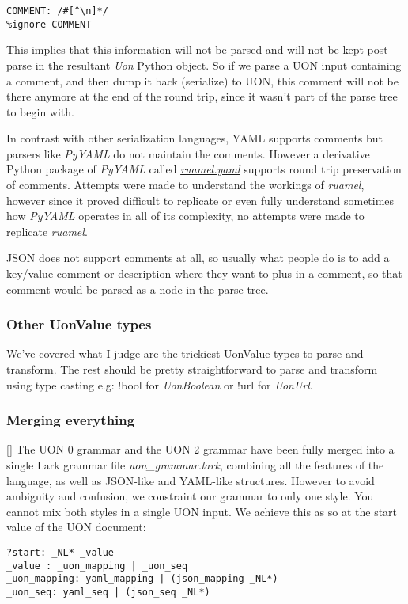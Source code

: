 \documentclass[12pt]{article}
\begin{document}
\begin{lstlisting}
COMMENT: /#[^\n]*/
%ignore COMMENT
\end{lstlisting}

This implies that this information will not be parsed and will not be kept post-parse in the resultant \emph{Uon} Python object. So if we parse a UON input containing a comment, and then dump it back (serialize) to UON, this comment will not be there anymore at the end of the round trip, since it wasn't part of the parse tree to begin with.

In contrast with other serialization languages, YAML supports comments but parsers like \emph{PyYAML} do not maintain the comments. However a derivative Python package of \emph{PyYAML} called \href{https://yaml.readthedocs.io/en/latest/}{\emph{ruamel.yaml}} supports round trip preservation of comments. Attempts were made to understand the workings of \emph{ruamel}, however since it proved difficult to replicate or even fully understand sometimes how \emph{PyYAML} operates in all of its complexity, no attempts were made to replicate \emph{ruamel}.

JSON does not support comments at all, so usually what people do is to add a key/value comment or description where they want to plus in a comment, so that comment would be parsed as a node in the parse tree.

\subsubsection{Other UonValue types}
We've covered what I judge are the trickiest UonValue types to parse and transform. The rest should be pretty straightforward to parse and transform using type casting e.g: !bool for \emph{UonBoolean} or !url for \emph{UonUrl}.

\subsubsection{Merging everything}[\label{uontopython:merging}]
The UON 0 grammar and the UON 2 grammar have been fully merged into a single Lark grammar file \emph{uon\_grammar.lark}, combining all the features of the language, as well as JSON-like and YAML-like structures. However to avoid ambiguity and confusion, we constraint our grammar to only one style. You cannot mix both styles in a single UON input. We achieve this as so at the start value of the UON document:

\begin{lstlisting}
?start: _NL* _value
_value : _uon_mapping | _uon_seq
_uon_mapping: yaml_mapping | (json_mapping _NL*)
_uon_seq: yaml_seq | (json_seq _NL*)
\end{lstlisting}
\end{document}
